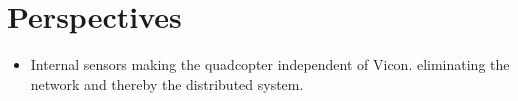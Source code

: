 \chapter{Perspectives}
\begin{itemize}
\item Internal sensors making the quadcopter independent of Vicon.
eliminating the network and thereby the distributed system. 

\end{itemize}